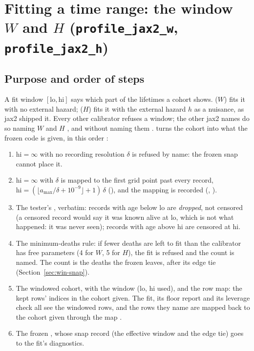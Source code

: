 \section{Fitting a time range: the window $W$ and $H$ (\texttt{profile\_jax2\_w}, \texttt{profile\_jax2\_h})}\label{sec:win}

\subsection{Purpose and order of steps}\label{sec:win-order}

A fit window $[\mathrm{lo},\mathrm{hi}]$ says which part of the lifetimes a cohort shows.  ($W$) fits
it with no external hazard;  ($H$) fits it with the external hazard $h$ as a nuisance, as jax2
shipped it. Every other calibrator refuses a window; the other jax2 names do so naming $W$ and $H$
, and  without naming them
.  turns the cohort into what the frozen
code is given, in this order :
\begin{enumerate}[nosep]
  \item $\mathrm{hi}=\infty$ with no recording resolution $\delta$ is refused by name: the frozen snap cannot place it.
  \item $\mathrm{hi}=\infty$ with $\delta$ is mapped to the first grid point past every record,
    $\mathrm{hi}=(\lfloor a_{\max}/\delta+10^{-9}\rfloor+1)\,\delta$ (), and the mapping is recorded
    (, ).
  \item The tester's  , verbatim: records with
    age below lo are \emph{dropped}, not censored (a censored record would say it was known alive at lo, which is not
    what happened: it was never seen); records with age above hi are censored at hi.
  \item The minimum-deaths rule: if fewer deaths are left to fit than the calibrator has free parameters (4 for $W$, 5
    for $H$), the fit is refused and the count is named. The count is the deaths the frozen  leaves, after
    its edge tie (Section~\ref{sec:win-snap}).
  \item The windowed cohort, with the window (lo, hi used), and the row map: the kept rows' indices in the cohort given.
    The fit, its floor report and its leverage check all see the windowed rows, and the rows they name are mapped back
    to the cohort given through the map .
  \item The frozen , whose snap record (the effective window and the edge tie) goes to the
    fit's diagnostics.
\end{enumerate}

